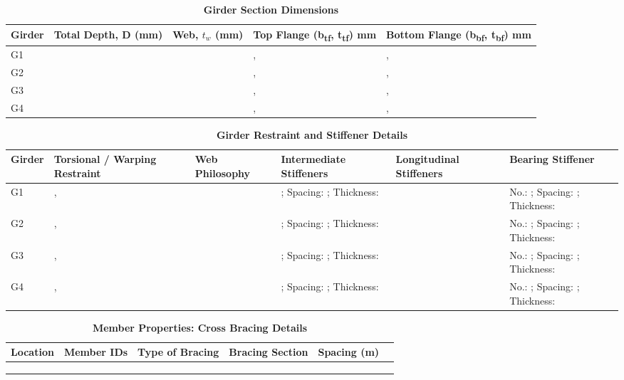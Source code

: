 \documentclass[12pt,a4paper]{report}
\numberwithin{table}{chapter}
\numberwithin{figure}{chapter}
\begin{document}
\vspace{0.6em}

\vspace{4pt}
\begin{longtable}{|L{1.8cm}|L{2.3cm}|L{1.8cm}|p{4.8cm}|p{4.8cm}|}
\caption{\textbf{Girder Section Dimensions}}\\
\hline
\textbf{Girder} & \textbf{Total Depth, D (mm)} & \textbf{Web, $t_w$ (mm)} & \textbf{Top Flange (b\textsubscript{tf}, t\textsubscript{tf}) mm} & \textbf{Bottom Flange (b\textsubscript{bf}, t\textsubscript{bf}) mm} \\[6pt]
\hline
G1 &  &  & ,  & ,  \\[8pt]
\hline
G2 &  &  & ,  & ,  \\[8pt]
\hline
G3 &  &  & ,  & ,  \\[8pt]
\hline
G4 &  &  & ,  & ,  \\[8pt]
\hline
\end{longtable}

\vspace{0.6em}

\vspace{4pt}
\begin{longtable}{|L{1.4cm}|p{2.2cm}|p{2.2cm}|p{3.0cm}|p{2.4cm}|p{2.2cm}|}
\caption{\textbf{Girder Restraint and Stiffener Details}}\\
\hline
\textbf{Girder} & \textbf{Torsional / Warping Restraint} & \textbf{Web Philosophy} & \textbf{Intermediate Stiffeners} & \textbf{Longitudinal Stiffeners} & \textbf{Bearing Stiffener} \\[6pt]
\hline
\endfirsthead
\endhead

G1 & ,  &  & ; Spacing: ; Thickness:  &  & No.: ; Spacing: ; Thickness:  \\[8pt]
\hline
G2 & ,  &  & ; Spacing: ; Thickness:  &  & No.: ; Spacing: ; Thickness:  \\[8pt]
\hline
G3 & ,  &  & ; Spacing: ; Thickness:  &  & No.: ; Spacing: ; Thickness:  \\[8pt]
\hline
G4 & ,  &  & ; Spacing: ; Thickness:  &  & No.: ; Spacing: ; Thickness:  \\[8pt]
\hline
\end{longtable}



\newpage

\vspace{0.4em}
\setlength{\tabcolsep}{4pt}
\setlength\LTleft{0pt}
\setlength\LTright{\fill}

\begin{longtable}{|L{2.2cm}|L{2.2cm}|L{3.0cm}|L{2.5cm}|C{1.8cm}|C{1.8cm}|}
\caption{\textbf{Member Properties: Cross Bracing Details}}\\
\hline
\textbf{Location} & \textbf{Member IDs} & \textbf{Type of Bracing} & \textbf{Bracing Section} & \textbf{Spacing (m)} \\
\hline
 &  &  &  &  \\[6pt]
\hline
 &  &  &  &  \\[6pt]
\hline
 &  &  &  &  \\[6pt]
\hline
\end{longtable}
\end{document}
